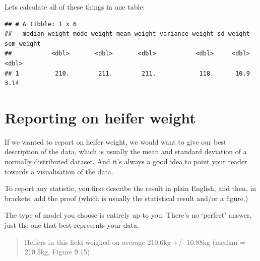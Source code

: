 \documentclass[
]{book}
\newenvironment{Shaded}{\begin{snugshade}}{\end{snugshade}}
\newcommand{\DataTypeTok}[1]{\textcolor[rgb]{0.13,0.29,0.53}{#1}}
\newcommand{\KeywordTok}[1]{\textcolor[rgb]{0.13,0.29,0.53}{\textbf{#1}}}
\newcommand{\NormalTok}[1]{#1}
\newcommand{\OperatorTok}[1]{\textcolor[rgb]{0.81,0.36,0.00}{\textbf{#1}}}
\newcommand{\StringTok}[1]{\textcolor[rgb]{0.31,0.60,0.02}{#1}}
\begin{document}
Lets calculate all of these things in one table:

\begin{Shaded}
\end{Shaded}

\begin{verbatim}
## # A tibble: 1 x 6
##   median_weight mode_weight mean_weight variance_weight sd_weight sem_weight
##           <dbl>       <dbl>       <dbl>           <dbl>     <dbl>      <dbl>
## 1          210.        211.        211.            118.      10.9       3.14
\end{verbatim}

\hypertarget{reporting-on-heifer-weight}{%
\section{Reporting on heifer weight}\label{reporting-on-heifer-weight}}

If we wanted to report on heifer weight, we would want to give our best description of the data, which is usually the mean and standard deviation of a normally distributed dataset. And it's always a good idea to point your reader towards a visualisation of the data.

To report any statistic, you first describe the result in plain English, and then, in brackets, add the proof (which is usually the statistical result and/or a figure.)

The type of model you choose is entirely up to you. There's no `perfect' answer, just the one that best represents your data.

\begin{quote}
Heifers in this field weighed on average 210.6kg +/- 10.88kg (median = 210.5kg, Figure 9.15)
\end{quote}
\end{document}
